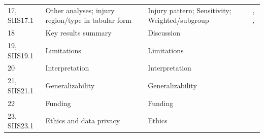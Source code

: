\begin{longtable}{p{1.9cm} p{5.9cm} p{2.6cm} p{1.4cm}}
17, SIIS17.1 & Other analyses; injury region/type in tabular form & Injury pattern; Sensitivity; Weighted/subgroup & \pageref{sec:results-pattern}, \pageref{sec:results-sensitivity}, \pageref{sec:results-weighted-subgroups} \\
18 & Key results summary & Discussion & \pageref{sec:discussion-key} \\
19, SIIS19.1 & Limitations & Limitations & \pageref{sec:discussion-limitations} \\
20 & Interpretation & Interpretation & \pageref{sec:discussion-interpretation} \\
21, SIIS21.1 & Generalizability & Generalizability & \pageref{sec:discussion-generalizability} \\
22 & Funding & Funding & \pageref{sec:funding} \\
23, SIIS23.1 & Ethics and data privacy & Ethics & \pageref{sec:ethics} \\
\end{longtable}
\endgroup
